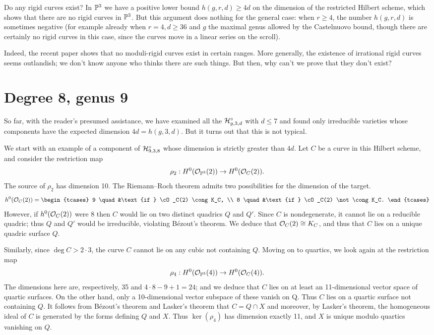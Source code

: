 Do any rigid curves exist? In $\mathbb P^{3}$ we have a positive lower bound
$h(g,r,d)\geq 4d$
on the dimension of the restricted Hilbert scheme, which shows that
there are no rigid
curves in $\mathbb P^{3}$. But this argument does nothing for the general case:
when $r \geq 4$, the number $h(g,r,d)$ is sometimes negative
(for example already when $r = 4, d\geq 36$ and $g$ the maximal genus
allowed by
the Castelnuovo bound, though there are certainly no rigid curves in
this case,
since the curves move in a linear series on the scroll).

Indeed, the recent paper \cite{MR3980289} shows that no moduli-rigid
curves
exist in certain ranges. More generally,  the existence of irrational
rigid curves seems outlandish; we don't know anyone who thinks there
are such things. But then, why can't we prove that they don't exist?



\section{Degree 8, genus 9}\label{degree 8 section}

So far, with the reader's presumed assistance, we have examined all the
$\mathcal H^\circ_{g,3,d}$ with $d\leq 7$
and found only irreducible varieties whose components have the expected
dimension $4d = h(g,3,d)$. But it turns out that
this is not typical.

We start with an example of a component of $\mathcal H^\circ_{9,3,8}$ whose
dimension is strictly greater than $4d$.  Let $C$ be  a curve in this
Hilbert scheme, and consider the restriction map
$$
\rho_2 : H^0({\mathcal O}_{\mathbb P^3}(2)) \to H^0({\mathcal O}_C(2)).
$$
The source of $\rho_2$ has dimension 10. The Riemann--Roch theorem admits
two possibilities for the dimension
of the target.
$$
h^0(\cO_C(2)) =
\begin{tcases}
9 \quad &\text{if } \cO_C(2) \cong K_C, \\
8 \quad &\text{if } \cO_C(2) \not\cong K_C.
\end{tcases}
$$
However, if $h^0({\mathcal O}_C(2))$ were 8 then $C$ would  lie on two distinct
quadrics $Q$ and $Q'$. Since $C$ is nondegenerate, it cannot lie on a
reducible quadric; thus $Q$ and $Q'$ would  be irreducible,  violating
B\'ezout's theorem. We deduce that ${\mathcal O}_C(2) \cong K_C$, and thus that
$C$ lies on a unique quadric surface $Q$.

Similarly, since $\deg C > 2\cdot 3$, the curve $C$ cannot lie on any
cubic not containing $Q$. Moving on to quartics, we look again at the
restriction map
$$
\rho_4 : H^0({\mathcal O}_{\mathbb P^3}(4)) \to H^0({\mathcal O}_C(4)).
$$
The dimensions here are, respectively, 35 and $4\cdot 8 - 9 + 1 = 24$;
and we deduce that $C$ lies on at least an 11-dimensional vector space
of quartic surfaces. On the other hand, only a 10-dimensional vector
subspace of these vanish on Q. Thus $C$ lies on a quartic surface not
containing $Q$. It follows from B\'ezout's theorem and
Lasker's theorem that  $C = Q \cap X$
and moreover, by Lasker's theorem, the homogeneous ideal of $C$ is
generated by the forms defining $Q$ and $X$. Thus $\ker(\rho_4)$ has
dimension exactly 11, and  $X$ is unique modulo quartics vanishing on $Q$.

